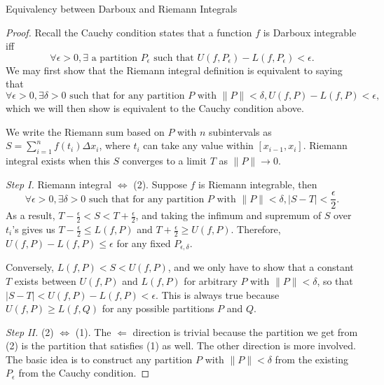 \documentclass{article}
\begin{document}
\begin{center}
    \Large Equivalency between Darboux and Riemann Integrals
\end{center}

\begin{proof}
    Recall the Cauchy condition states that a function $f$ is Darboux integrable iff 
    \begin{equation}
        \forall \epsilon>0, \exists \text{ a partition } P_\epsilon \text{ such that } U(f, P_\epsilon) - L(f, P_\epsilon) < \epsilon.
    \end{equation}
    We may first show that the Riemann integral definition is equivalent to saying that
    \begin{equation}
        \forall \epsilon > 0, \exists \delta > 0 \text{ such that for any partition } P \text{ with } \|P\| < \delta, U(f, P) - L(f, P) < \epsilon,
    \end{equation}
    which we will then show is equivalent to the Cauchy condition above. 
    
    We write the Riemann sum based on $P$ with $n$ subintervals as $S = \sum_{i = 1}^{n} f(t_i) \Delta x_i$, where $t_i$ can take any value within $[ x_{i-1}, x_{i}]$. Riemann integral exists when this $S$ converges to a limit $T$ as $\|P\| \to 0$.
    
    \emph{Step I.} Riemann integral $\Longleftrightarrow$ (2).
    Suppose $f$ is Riemann integrable, then $$\forall \epsilon > 0, \exists \delta > 0 \text{ such that for any partition } P \text{ with } \|P\| < \delta, |S - T| < \frac{\epsilon}{2}.$$
    As a result, $T - \frac{\epsilon}{2} < S < T + \frac{\epsilon}{2}$, and taking the infimum and supremum of $S$ over $t_i$'s gives us $T - \frac{\epsilon}{2} \leq L(f,P)$ and $T + \frac{\epsilon}{2} \geq U(f,P)$. Therefore, $U(f,P) - L(f,P) \leq \epsilon$ for any fixed $P_{\epsilon,\delta}$.
    
    Conversely, $L(f,P) < S < U(f,P)$, and we only have to show that a constant $T$ exists between $U(f,P)$ and $L(f,P)$ for arbitrary $P$ with $\|P\| < \delta$, so that $|S - T| < U(f,P) - L(f,P) < \epsilon$. This is always true because $U(f,P) \geq L(f,Q)$ for any possible partitions $P$ and $Q$.
    
    \emph{Step II.} (2) $\Longleftrightarrow$ (1). The $\Longleftarrow$ direction is trivial because the partition we get from (2) is the partition that satisfies (1) as well.
    The other direction is more involved. The basic idea is to construct any partition $P$ with $\|P\| < \delta$ from the existing $P_\epsilon$ from the Cauchy condition.
    

\end{proof}
\end{document}
